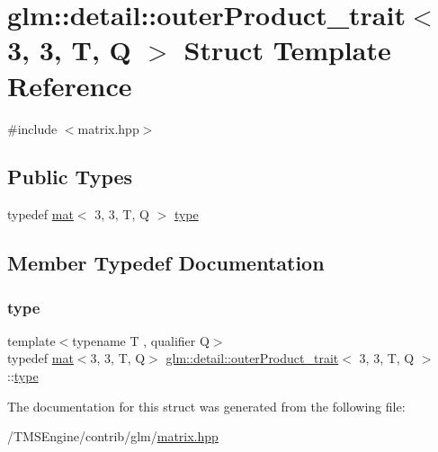\hypertarget{structglm_1_1detail_1_1outer_product__trait_3_013_00_013_00_01_t_00_01_q_01_4}{}\section{glm\+:\+:detail\+:\+:outer\+Product\+\_\+trait$<$ 3, 3, T, Q $>$ Struct Template Reference}
\label{structglm_1_1detail_1_1outer_product__trait_3_013_00_013_00_01_t_00_01_q_01_4}


{\ttfamily \#include $<$matrix.\+hpp$>$}

\subsection*{Public Types}
\begin{DoxyCompactItemize}
\item 
typedef \hyperlink{structglm_1_1mat}{mat}$<$ 3, 3, T, Q $>$ \hyperlink{structglm_1_1detail_1_1outer_product__trait_3_013_00_013_00_01_t_00_01_q_01_4_a40c77da697de58aa2f84dab85c4d9ee8}{type}
\end{DoxyCompactItemize}


\subsection{Member Typedef Documentation}
\mbox{\label{structglm_1_1detail_1_1outer_product__trait_3_013_00_013_00_01_t_00_01_q_01_4_a40c77da697de58aa2f84dab85c4d9ee8}} 
\subsubsection{\texorpdfstring{type}{type}}
{\footnotesize\ttfamily template$<$typename T , qualifier Q$>$ \\
typedef \hyperlink{structglm_1_1mat}{mat}$<$3, 3, T, Q$>$ \hyperlink{structglm_1_1detail_1_1outer_product__trait}{glm\+::detail\+::outer\+Product\+\_\+trait}$<$ 3, 3, T, Q $>$\+::\hyperlink{structglm_1_1detail_1_1outer_product__trait_3_013_00_013_00_01_t_00_01_q_01_4_a40c77da697de58aa2f84dab85c4d9ee8}{type}}



The documentation for this struct was generated from the following file\+:\begin{DoxyCompactItemize}
\item 
/\+T\+M\+S\+Engine/contrib/glm/\hyperlink{matrix_8hpp}{matrix.\+hpp}\end{DoxyCompactItemize}
